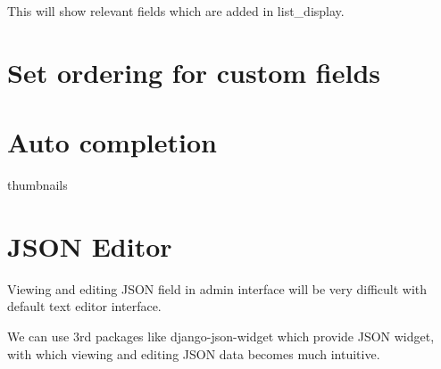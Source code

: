 \documentclass[letterpaper,12pt,english]{sphinxmanual}
\begin{document}
This will show relevant fields which are added in list\_display.





\section{Set ordering for custom fields}
\label{\detokenize{admin_better_defaults:set-ordering-for-custom-fields}}
\begin{sphinxVerbatim}[commandchars=\\\{\}]
  
     
  
\end{sphinxVerbatim}


\section{Auto completion}
\label{\detokenize{admin_better_defaults:auto-completion}}
thumbnails


\section{JSON Editor}
\label{\detokenize{admin_better_defaults:json-editor}}
Viewing and editing JSON field in admin interface will be very difficult with default text editor interface.

We can use 3rd packages like django-json-widget which provide JSON widget, with which viewing and editing JSON data becomes much intuitive.

\begin{sphinxVerbatim}[commandchars=\\\{\}]
   
   
   
   


 
      
          
\end{sphinxVerbatim}
\end{document}
